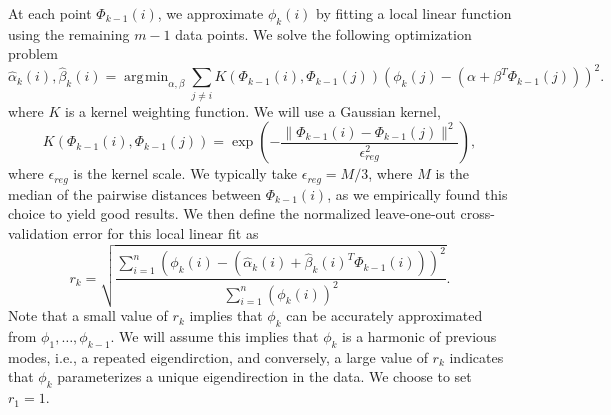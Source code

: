 \documentclass[preprint]{elsarticle}
\DeclareMathOperator*{\argmin}{\arg\!\min}
\begin{document}
At each point $\Phi_{k-1}(i)$, we approximate $\phi_k(i)$ by fitting a local linear function using the remaining $m-1$ data points. 
%
We solve the following optimization problem 
\begin{equation} \label{eq:opt_problem}
\hat{\alpha}_k (i) , \hat{\beta}_k(i)  = \argmin_{\alpha, \beta} \sum_{j \ne i} K(\Phi_{k-1}(i), \Phi_{k-1}(j)) \left( \phi_{k}(j) - (\alpha + \beta^T \Phi_{k-1}(j)) \right)^2.
\end{equation}
%
where $K$ is a kernel weighting function.
%
We will use a Gaussian kernel, 
%
\begin{equation}
K(\Phi_{k-1}(i), \Phi_{k-1}(j))  = \exp \left( - \frac{\|\Phi_{k-1}(i) - \Phi_{k-1} (j) \|^2}{\epsilon_{reg}^2} \right),
\end{equation}
%
where $\epsilon_{reg}$ is the kernel scale. 
%
We typically take $\epsilon_{reg} = M / 3$, where $M$ is the median of the pairwise distances between $\Phi_{k-1}(i)$, as we empirically found this choice to yield good results. 
%
We then define the normalized leave-one-out cross-validation error for this local linear fit as
\begin{equation} \label{eq:cv_error}
r_{k} = \sqrt{ \frac{\sum_{i=1}^n \left( \phi_{k} (i) - (\hat{\alpha}_k(i) + \hat{\beta}_k(i)^T \Phi_{k-1}(i))  \right)^2} {\sum_{i=1}^n  \left( \phi_{k} (i) \right)^2 }}.
\end{equation}
%
Note that a small value of $r_k$ implies that $\phi_{k}$ can be accurately approximated from $\phi_1, \dots, \phi_{k-1}$. 
%
We will assume this implies that $\phi_k$ is a harmonic of previous modes, i.e., a repeated eigendirction, and conversely, a large value of $r_{k}$ indicates that $\phi_{k}$ parameterizes a unique eigendirection in the data.
%
We choose to set $r_1 = 1$.
\end{document}
